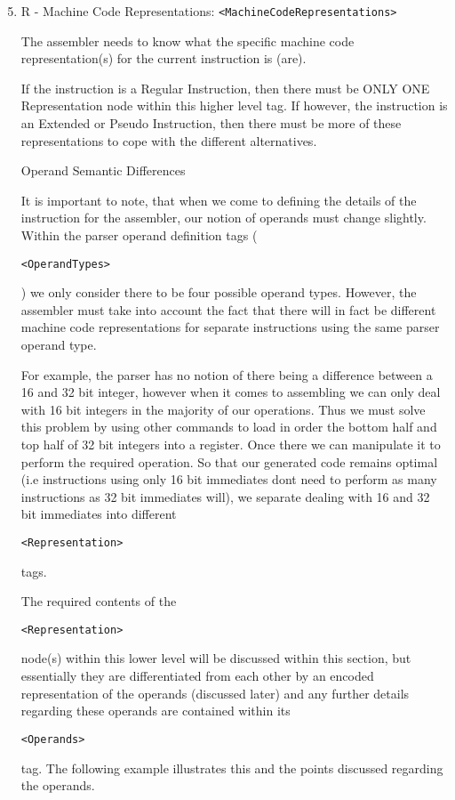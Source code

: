 \begin{enumerate}
\setcounter{enumi}{4}

\item R - Machine Code Representations: \verb"<MachineCodeRepresentations>"

The assembler needs to know what the specific machine code representation(s) for the current instruction is (are).

If the instruction is a Regular Instruction, then there must be ONLY ONE Representation node within this higher level tag. If however, the instruction is an Extended or Pseudo Instruction, then there must be more of these representations to cope with the different alternatives.


Operand Semantic Differences

It is important to note, that when we come to defining the details of the instruction for the assembler, our notion of operands must change slightly. Within the parser operand definition tags (\begin{verbatim}<OperandTypes>\end{verbatim}) we only consider there to be four possible operand types. However, the assembler must take into account the fact that there will in fact be different machine code representations for separate instructions using the same parser operand type.

For example, the parser has no notion of there being a difference between a 16 and 32 bit integer, however when it comes to assembling we can only deal with 16 bit integers in the majority of our operations. Thus we must solve this problem by using other commands to load in order the bottom half and top half of 32 bit integers into a register. Once there we can manipulate it to perform the required operation. So that our generated code remains optimal (i.e instructions using only 16 bit immediates dont need to perform as many instructions as 32 bit immediates will), we separate dealing with 16 and 32 bit immediates into different \begin{verbatim}<Representation>\end{verbatim} tags.

The required contents of the \begin{verbatim}<Representation>\end{verbatim} node(s) within this lower level will be discussed within this section, but essentially they are differentiated from each other by an encoded representation of the operands (discussed later) and any further details regarding these operands are contained within its \begin{verbatim}<Operands>\end{verbatim} tag. The following example illustrates this and the points discussed regarding the operands.


\end{enumerate}

